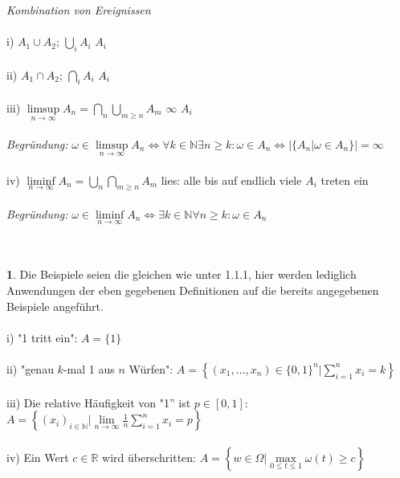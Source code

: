 \documentclass[10pt,a4paper]{report}
\numberwithin{equation}{section}
\numberwithin{figure}{section}
\theoremstyle{plain}
\theoremstyle{definition}
\theoremstyle{plain}
\theoremstyle{definition}
\newtheorem{example}{\protect\examplename}[section]
\theoremstyle{remark}
\theoremstyle{plain}
\theoremstyle{plain}
\theoremstyle{plain}
\theoremstyle{plain}
\theoremstyle{plain}
\providecommand{\examplename}{Beispiel}
\newcommand{\1}{ \mathbb{1} } %
\begin{document}
\textit{Kombination von Ereignissen}\\\\
i) $A_1 \cup A_2$; $\bigcup\limits_i A_i$\qquad {} $A_i$ \\\\
ii) $A_1 \cap A_2$; $\bigcap\limits_i A_i$\qquad {} $A_i$ \\\\
iii) $\limsup\limits_{n \to \infty} A_n=\bigcap\limits_{n}\bigcup\limits_{m\geq n}A_m$\qquad {} $\infty$ $A_i$  \\\\
\textit{Begründung:} $\omega \in \limsup\limits_{n \to \infty} A_n \Leftrightarrow \forall k \in \mathbb{N} \exists n\geq k: \omega \in A_n \Leftrightarrow |\{A_n|\omega \in A_n\}|=\infty$\\\\
iv) $\liminf\limits_{n \to \infty} A_n=\bigcup\limits_{n}\bigcap\limits_{m\geq n}A_m$ \qquad lies: alle bis auf endlich viele $A_i$ treten ein\\\\
\textit{Begründung:} $\omega \in \liminf\limits_{n \to \infty} A_n \Leftrightarrow \exists k \in \mathbb{N} \forall n\geq k: \omega \in A_n$\\\\\\
\begin{example}
  Die Beispiele seien die gleichen wie unter 1.1.1, hier werden lediglich Anwendungen der eben gegebenen Definitionen auf die bereits angegebenen Beispiele angeführt.\\\\
  i) "1 tritt ein": $A=\{1\}$ \\\\
  ii) "genau $k$-mal 1 aus $n$ Würfen": $A=\left\{(x_1,\dots,x_n) \in \{0,1\}^n| \sum\limits_{i=1}^nx_i=k\right\}$\\\\
  iii) Die relative Häufigkeit von "1'' ist $p \in [0,1]$: $A=\left\{(x_i)_{i \in \mathbb{N}}|\lim\limits_{n \to \infty}\frac{1}{n}\sum\limits_{i=1}^n x_i=p\right\}$\\\\
  iv) Ein Wert $c \in \mathbb{R}$ wird überschritten: $A=\left\{w \in \Omega| \max\limits_{0\leq t\leq 1}\omega(t)\geq c \right\}$  \\\\\\
\end{example}
\end{document}
